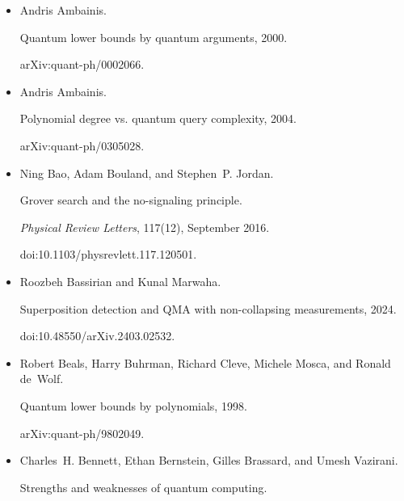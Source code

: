 \begin{itemize}
doi:10.48550/arXiv.2403.02543.





\item[] 
[7]

Andris Ambainis.


Quantum lower bounds by quantum arguments, 2000.


arXiv:quant-ph/0002066.





\item[] 
[8]

Andris Ambainis.


Polynomial degree vs. quantum query complexity, 2004.


arXiv:quant-ph/0305028.





\item[] 
[9]

Ning Bao, Adam Bouland, and Stephen P. Jordan.


Grover search and the no-signaling principle.


\emph{Physical Review Letters}, 117(12), September 2016.


doi:10.1103/physrevlett.117.120501.





\item[] 
[10]

Roozbeh Bassirian and Kunal Marwaha.


Superposition detection and QMA with non-collapsing measurements,
2024.


doi:10.48550/arXiv.2403.02532.





\item[] 
[11]

Robert Beals, Harry Buhrman, Richard Cleve, Michele Mosca, and Ronald de Wolf.


Quantum lower bounds by polynomials, 1998.


arXiv:quant-ph/9802049.





\item[] 
[12]

Charles H. Bennett, Ethan Bernstein, Gilles Brassard, and Umesh Vazirani.


Strengths and weaknesses of quantum computing.



\end{itemize}
